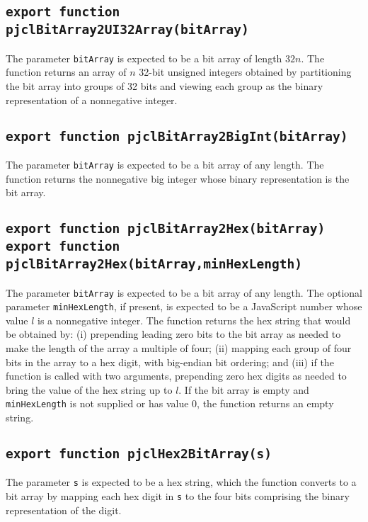\documentclass[12pt]{article}
\begin{document}
\subsection{\tt export function pjclBitArray2UI32Array(bitArray)}

The parameter {\tt bitArray} is expected to be a bit array of length
$32n$.  The function returns an array of $n$ 32-bit unsigned integers
obtained by partitioning the bit array into groups of 32 bits and
viewing each group as the binary representation of a nonnegative
integer.

\subsection{\tt export function pjclBitArray2BigInt(bitArray)}

The parameter {\tt bitArray} is expected to be a bit array of any length.  The
function returns the nonnegative big integer whose binary representation is the
bit array.

\subsection{\tt export function pjclBitArray2Hex(bitArray)\\export function pjclBitArray2Hex(bitArray,minHexLength)}

The parameter {\tt bitArray} is expected to be a bit array of any length.  
The optional parameter {\tt minHexLength}, if present, is expected to be a JavaScript
number whose value $l$ is a nonnegative integer.  The
function returns the hex string that would be obtained by: (i) prepending leading zero
bits to the bit array as needed to make the length of the array a
multiple of four; (ii) mapping each group of four bits in the array to a hex digit,
with big-endian bit ordering; and (iii) if the function is called with two arguments,
prepending zero hex digits as needed to bring the value of the hex string up to $l$.
If the bit array is empty and {\tt minHexLength} is not supplied or has value 0,
the function returns an empty string.

\subsection{\tt export function pjclHex2BitArray(s)}

The parameter {\tt s} is expected to be a hex string, which the
function converts to a bit array by mapping each hex digit in {\tt s}
to the four bits comprising the binary representation of the digit.
\end{document}
